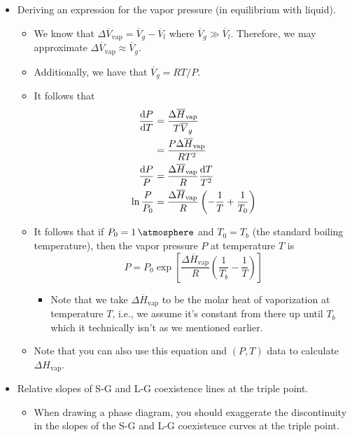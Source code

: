 \documentclass[../notes.tex]{subfiles}
\begin{document}
\begin{itemize}
\begin{itemize}
    \end{itemize}
    \item Deriving an expression for the vapor pressure (in equilibrium with liquid).
    \begin{itemize}
        \item We know that $\Delta\overline{V}_\text{vap}=\overline{V}_g-\overline{V}_l$ where $\overline{V}_g\gg\overline{V}_l$. Therefore, we may approximate $\Delta\overline{V}_\text{vap}\approx\overline{V}_g$.
        \item Additionally, we have that $\overline{V}_g=RT/P$.
        \item It follows that
        \begin{align*}
            \dv{P}{T} &= \frac{\Delta\overline{H}_\text{vap}}{T\overline{V}_g}\\
            &= \frac{P\Delta\overline{H}_\text{vap}}{RT^2}\\
            \frac{\dd{P}}{P} &= \frac{\Delta\overline{H}_\text{vap}}{R}\frac{\dd{T}}{T^2}\\
            \ln\frac{P}{P_0} &= \frac{\Delta\overline{H}_\text{vap}}{R}\left( -\frac{1}{T}+\frac{1}{T_0} \right)
        \end{align*}
        \item It follows that if $P_0=\SI{1}{\atmosphere}$ and $T_0=T_b$ (the standard boiling temperature), then the vapor pressure $P$ at temperature $T$ is
        \begin{equation*}
            P = P_0\exp\left[ \frac{\Delta\overline{H}_\text{vap}}{R}\left( \frac{1}{T_b}-\frac{1}{T} \right) \right]
        \end{equation*}
        \begin{itemize}
            \item Note that we take $\Delta\overline{H}_\text{vap}$ to be the molar heat of vaporization at temperature $T$, i.e., we assume it's constant from there up until $T_b$ which it technically isn't as we mentioned earlier.
        \end{itemize}
        \item Note that you can also use this equation and $(P,T)$ data to calculate $\Delta H_\text{vap}$.
    \end{itemize}
    \item Relative slopes of S-G and L-G coexistence lines at the triple point.
    \begin{itemize}
        \item When drawing a phase diagram, you should exaggerate the discontinuity in the slopes of the S-G and L-G coexistence curves at the triple point.

\end{itemize}
\end{itemize}
\end{document}
